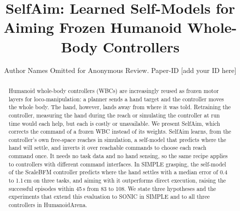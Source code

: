 \documentclass[conference]{IEEEtran}
\begin{document}
\title{SelfAim: Learned Self-Models for Aiming Frozen Humanoid Whole-Body Controllers}

\author{Author Names Omitted for Anonymous Review. Paper-ID [add your ID here]}

\maketitle

\begin{abstract}
Humanoid whole-body controllers (WBCs) are increasingly reused as frozen motor layers for loco-manipulation: a planner sends a hand target and the controller moves the whole body. The hand, however, lands away from where it was told. Retraining the controller, measuring the hand during the reach or simulating the controller at run time would each help, but each is costly or unavailable. We present SelfAim, which corrects the command of a frozen WBC instead of its weights. SelfAim learns, from the controller's own free-space reaches in simulation, a self-model that predicts where the hand will settle, and inverts it over reachable commands to choose each reach command once. It needs no task data and no hand sensing, so the same recipe applies to controllers with different command interfaces. In SIMPLE grasping, the self-model of the ScaleBFM controller predicts where the hand settles with a median error of 0.4 to 1.1\,cm on three tasks, and aiming with it outperforms direct execution, raising the successful episodes within 45\,s from 83 to 108. We state three hypotheses and the experiments that extend this evaluation to SONIC in SIMPLE and to all three controllers in HumanoidArena.
\end{abstract}

\IEEEpeerreviewmaketitle

\end{document}
